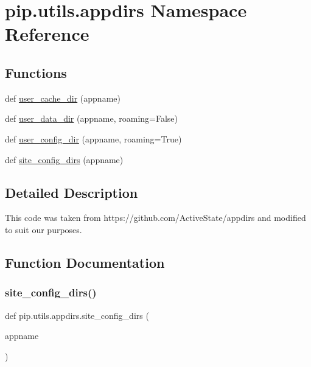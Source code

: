 \hypertarget{namespacepip_1_1utils_1_1appdirs}{}\section{pip.\+utils.\+appdirs Namespace Reference}
\label{namespacepip_1_1utils_1_1appdirs}
\subsection*{Functions}
\begin{DoxyCompactItemize}
\item 
def \hyperlink{namespacepip_1_1utils_1_1appdirs_a8cd2621f5d2fbf2cc93804d3d4b210ee}{user\+\_\+cache\+\_\+dir} (appname)
\item 
def \hyperlink{namespacepip_1_1utils_1_1appdirs_a0bb2954b57ef8ec560d327ab702d0888}{user\+\_\+data\+\_\+dir} (appname, roaming=False)
\item 
def \hyperlink{namespacepip_1_1utils_1_1appdirs_a687d06cd73d2aeb3b41903608969cc64}{user\+\_\+config\+\_\+dir} (appname, roaming=True)
\item 
def \hyperlink{namespacepip_1_1utils_1_1appdirs_a95dd2cacdbaaac1e372d4adb6858b7e8}{site\+\_\+config\+\_\+dirs} (appname)
\end{DoxyCompactItemize}


\subsection{Detailed Description}
\begin{DoxyVerb}This code was taken from https://github.com/ActiveState/appdirs and modified
to suit our purposes.
\end{DoxyVerb}
 

\subsection{Function Documentation}
\mbox{\label{namespacepip_1_1utils_1_1appdirs_a95dd2cacdbaaac1e372d4adb6858b7e8}} 
\subsubsection{\texorpdfstring{site\+\_\+config\+\_\+dirs()}{site\_config\_dirs()}}
{\footnotesize\ttfamily def pip.\+utils.\+appdirs.\+site\+\_\+config\+\_\+dirs (\begin{DoxyParamCaption}\item[{}]{appname }\end{DoxyParamCaption})}

